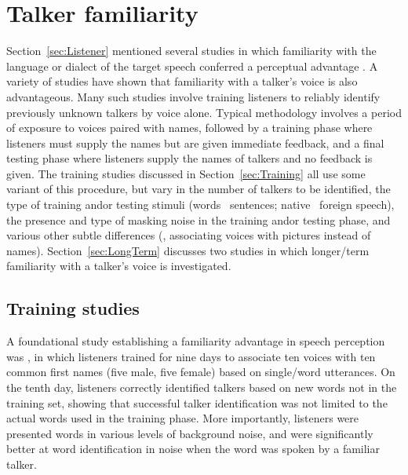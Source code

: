 
\section{Talker familiarity\label{sec:Fam}}
Section~\ref{sec:Listener} mentioned several studies in which familiarity with the language or dialect of the target speech conferred a perceptual advantage \citep[\eg,][]{BentBradlow2003, ImaiEtAl2005, PinetEtAl2011}.  A variety of studies have shown that familiarity with a talker’s voice is also advantageous.  Many such studies involve training listeners to reliably identify previously unknown talkers by voice alone.  Typical methodology involves a period of exposure to voices paired with names, followed by a training phase where listeners must supply the names but are given immediate feedback, and a final testing phase where listeners supply the names of talkers and no feedback is given.  The training studies discussed in Section~\ref{sec:Training} all use some variant of this procedure, but vary in the number of talkers to be identified, the type of training and\slsh or testing stimuli (words \vs\ sentences; native \vs\ foreign speech), the presence and type of masking noise in the training and\slsh or testing phase, and various other subtle differences (\eg, associating voices with pictures instead of names).  Section~\ref{sec:LongTerm} discusses two studies in which longer\-/term familiarity with a talker’s voice is investigated.

\subsection{Training studies\label{sec:Training}}
A foundational study establishing a familiarity advantage in speech perception was \citet{NygaardEtAl1994}, in which listeners trained for nine days to associate ten voices with ten common first names (five male, five female) based on single\-/word utterances.  On the tenth day, listeners correctly identified talkers based on new words not in the training set, showing that successful talker identification was not limited to the actual words used in the training phase.  More importantly, listeners were presented words in various levels of background noise, and were significantly better at word identification in noise when the word was spoken by a familiar talker.

